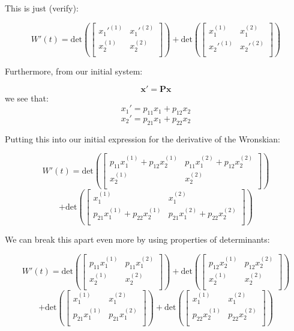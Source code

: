 \documentclass{report}
\begin{document}
This is just (verify):

$$
W'(t) =
\text{det}\left(
\begin{bmatrix}
    x_1'^{(1)} & x_1'^{(2)} \\
    x_2^{(1)} & x_2^{(2)} \\
\end{bmatrix}\right)
+
\text{det}\left(
\begin{bmatrix}
    x_1^{(1)} & x_1^{(2)} \\
    x_2'^{(1)} & x_2'^{(2)} \\
\end{bmatrix}\right)
$$

Furthermore, from our initial system:

$$\mathbf{x'} = \mathbf{Px}$$
we see that:
$$x_1' = p_{11}x_1 + p_{12}x_2$$
$$x_2' = p_{21}x_1 + p_{22}x_2$$

Putting this into our initial expression for the derivative of the Wronskian:

$$
W'(t) =
\text{det}\left(
\begin{bmatrix}
    p_{11}x_1^{(1)} + p_{12}x_2^{(1)} & p_{11}x_1^{(2)} + p_{12}x_2^{(2)} \\
    x_2^{(1)} & x_2^{(2)} \\
\end{bmatrix}\right)
$$
$$
+
\text{det}\left(
\begin{bmatrix}
    x_1^{(1)} & x_1^{(2)} \\
    p_{21}x_1^{(1)} + p_{22}x_2^{(1)} & p_{21}x_1^{(2)} + p_{22}x_2^{(2)} \\
\end{bmatrix}\right)
$$

We can break this apart even more by using properties of determinants:

$$
W'(t) =
\text{det}\left(
\begin{bmatrix}
    p_{11}x_1^{(1)} & p_{11}x_1^{(2)} \\
    x_2^{(1)} & x_2^{(2)} \\
\end{bmatrix}\right)
+
\text{det}\left(
\begin{bmatrix}
     p_{12}x_2^{(1)} &  p_{12}x_2^{(2)} \\
    x_2^{(1)} & x_2^{(2)} \\
\end{bmatrix}\right)
$$
$$
+
\text{det}\left(
\begin{bmatrix}
    x_1^{(1)} & x_1^{(2)} \\
    p_{21}x_1^{(1)} & p_{21}x_1^{(2)} \\
\end{bmatrix}\right)
+
\text{det}\left(
\begin{bmatrix}
    x_1^{(1)} & x_1^{(2)} \\
    p_{22}x_2^{(1)} &  p_{22}x_2^{(2)} \\
\end{bmatrix}\right)
$$
\end{document}
